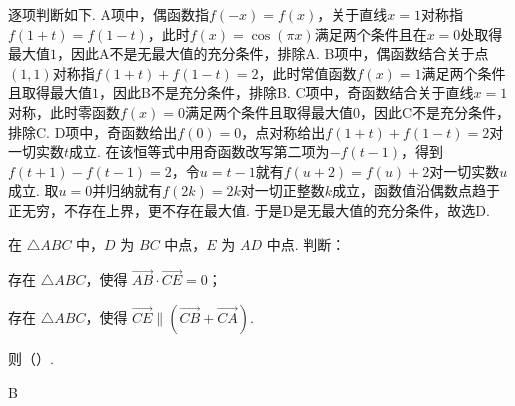 \begin{solution}
逐项判断如下. A项中，偶函数指\(f\left( -x \right)=f\left( x \right)\)，关于直线\(x=1\)对称指\(f\left( 1+t \right)=f\left( 1-t \right)\)，此时\(f\left( x \right)=\cos\left( \pi x \right)\)满足两个条件且在\(x=0\)处取得最大值\(1\)，因此A不是无最大值的充分条件，排除A. B项中，偶函数结合关于点\(\left( 1,1 \right)\)对称指\(f\left( 1+t \right)+f\left( 1-t \right)=2\)，此时常值函数\(f\left( x \right)=1\)满足两个条件且取得最大值\(1\)，因此B不是充分条件，排除B. C项中，奇函数结合关于直线\(x=1\)对称，此时零函数\(f\left( x \right)=0\)满足两个条件且取得最大值\(0\)，因此C不是充分条件，排除C. D项中，奇函数给出\(f\left( 0 \right)=0\)，点对称给出\(f\left( 1+t \right)+f\left( 1-t \right)=2\)对一切实数\(t\)成立. 在该恒等式中用奇函数改写第二项为\(-f\left( t-1 \right)\)，得到\(f\left( t+1 \right)-f\left( t-1 \right)=2\)，令\(u=t-1\)就有\(f\left( u+2 \right)=f\left( u \right)+2\)对一切实数\(u\)成立. 取\(u=0\)并归纳就有\(f\left( 2k \right)=2k\)对一切正整数\(k\)成立，函数值沿偶数点趋于正无穷，不存在上界，更不存在最大值. 于是D是无最大值的充分条件，故选D.
\end{solution}

\begin{problem}
在 \(\triangle ABC\) 中，\(D\) 为 \(BC\) 中点，\(E\) 为 \(AD\) 中点. 判断：
\begin{circlelist}
\item 存在 \(\triangle ABC\)，使得 \(\overrightarrow{AB}\cdot\overrightarrow{CE}=0\)；
\item 存在 \(\triangle ABC\)，使得 \(\overrightarrow{CE}\parallel(\overrightarrow{CB}+\overrightarrow{CA})\).
\end{circlelist}
则（\quad）.
\end{problem}

\begin{answer}
B
\end{answer}

